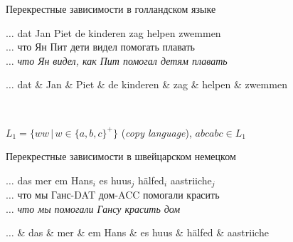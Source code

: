\documentclass{beamer}
\begin{document}
\begin{frame}{Перекрестные зависимости в голландском языке}
\begin{scriptsize}
\begin{exe}
	\ex 
		\gll $\ldots$ dat Jan Piet {de kinderen} zag helpen zwemmen\\
             $\ldots$ что Ян Пит дети видел помогать плавать\\
		\glt $\ldots$ \textit{что Ян видел, как Пит помогал детям плавать}
\end{exe}	
\end{scriptsize}

\begin{dependency}[theme = simple]
   \begin{deptext}[column sep=1em]
      $\ldots$ dat \& Jan \& Piet \& de kinderen \& zag \& helpen \& zwemmen \\
   \end{deptext}
\end{dependency}\\
\bigskip
\begin{center}
$L_1 = \{ww \, | \, w \in \{a, b, c\}^+\}$ (\textit{copy language}), $abcabc \in L_1$
\end{center}
\end{frame}

\begin{frame}{Перекрестные зависимости в швейцарском немецком}
\begin{scriptsize}
\begin{exe}
	\ex 
		\gll $\ldots$ das mer {em Hans}$_i$ {es huus}$_j$ h\"{a}lfed$_i$ aastriiche$_j$ \\
             $\ldots$ что мы Ганс-DAT дом-ACC помогали красить\\
		\glt $\ldots$ \textit{что мы помогали Гансу красить дом}
\end{exe}	
\end{scriptsize}

\begin{dependency}[theme = simple]
   \begin{deptext}[column sep=1em]
        $\ldots$ \& das \& mer \& em Hans \& es huus \& h\"{a}lfed \& aastriiche \\
   \end{deptext}
\end{dependency}\\
\end{frame}
\end{document}
